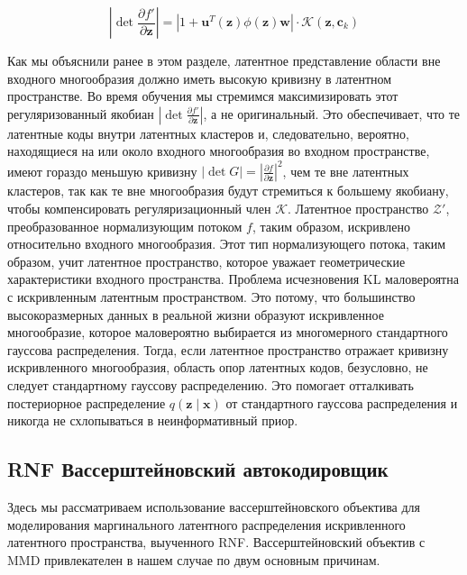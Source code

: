 \documentclass{article}
\begin{document}
\[
\left| \det \frac{\partial f'}{\partial \mathbf{z}} \right| = \left| 1 + \mathbf{u}^T(\mathbf{z}) \phi(\mathbf{z}) \mathbf{w} \right| \cdot \mathcal{K}(\mathbf{z}, \mathbf{c}_k)
\]

Как мы объяснили ранее в этом разделе, латентное представление области вне входного многообразия должно иметь высокую кривизну в латентном пространстве. Во время обучения мы стремимся максимизировать этот регуляризованный якобиан \(\left| \det \frac{\partial f'}{\partial \mathbf{z}} \right|\), а не оригинальный. Это обеспечивает, что те латентные коды внутри латентных кластеров и, следовательно, вероятно, находящиеся на или около входного многообразия во входном пространстве, имеют гораздо меньшую кривизну \(\left| \det G \right| = \left| \frac{\partial f}{\partial \mathbf{z}} \right|^2\), чем те вне латентных кластеров, так как те вне многообразия будут стремиться к большему якобиану, чтобы компенсировать регуляризационный член \(\mathcal{K}\). Латентное пространство \(\mathcal{Z}'\), преобразованное нормализующим потоком \(f\), таким образом, искривлено относительно входного многообразия. Этот тип нормализующего потока, таким образом, учит латентное пространство, которое уважает геометрические характеристики входного пространства. Проблема исчезновения KL маловероятна с искривленным латентным пространством. Это потому, что большинство высокоразмерных данных в реальной жизни образуют искривленное многообразие, которое маловероятно выбирается из многомерного стандартного гауссова распределения. Тогда, если латентное пространство отражает кривизну искривленного многообразия, область опор латентных кодов, безусловно, не следует стандартному гауссову распределению. Это помогает отталкивать постериорное распределение \(q(\mathbf{z} \mid \mathbf{x})\) от стандартного гауссова распределения и никогда не схлопываться в неинформативный приор.

\subsection{RNF Вассерштейновский автокодировщик}
Здесь мы рассматриваем использование вассерштейновского объектива для моделирования маргинального латентного распределения искривленного латентного пространства, выученного RNF. Вассерштейновский объектив с MMD привлекателен в нашем случае по двум основным причинам.
\end{document}
